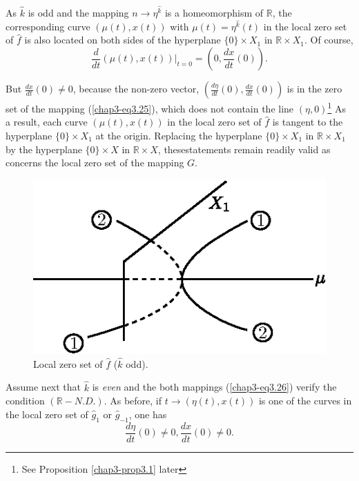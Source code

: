 As $\hat{k}$ is odd and the mapping $n \to \eta^{\hat{k}}$ is a
homeomorphism of $\mathbb{R}$, the corresponding curve $(\mu(t),
x(t))$ with $\mu(t) = \eta^{\hat{k}}(t)$ in the local zero set of
$\hat{f}$ is also located on both sides of the hyperplane $\{0\}
\times X_{1}$ in $\mathbb{R} \times X_{1}$. Of course,
$$
\frac{d}{dt} (\mu(t), x(t)) |_{t=0} = (0, \frac{dx}{dt} (0)).
$$

But $\frac{dx}{dt}(0) \neq 0$, because the non-zero vector,
$\left(\frac{d\eta}{dt}(0), \frac{dx}{dt} (0)\right)$ is in the zero
set of the mapping (\ref{chap3-eq3.25}), which does not contain the
line $(\eta, 0)$\footnote{See Proposition \ref{chap3-prop3.1} later}
As a result, each curve $(\mu(t), x(t))$ in the local zero set of
$\hat{f}$ is tangent to the hyperplane $\{0\} \times X_{1}$ at the
origin. Replacing the hyperplane $\{0\} \times X_{1}$ in $\mathbb{R}
\times X_{1}$ by the hyperplane $\{0\} \times X$ in $\mathbb{R} \times
X$, these\pageoriginale statements remain readily valid as concerns
the local zero set of the mapping $G$.
\begin{figure}[H]
\centering
\includegraphics{figure/fig76-3.2_1.eps}
\caption{Local zero set of $\hat{f}$ ($\hat{k}$ odd).}
\end{figure}


Assume next that $\hat{k}$ is {\em even} and the both mappings
(\ref{chap3-eq3.26}) verify the condition $(\mathbb{R}-N.D.)$. As
before, if $t \to (\eta(t), x(t))$ is one of the curves in the local
zero set of $\hat{g}_{1}$ or $\hat{g}_{-1}$, one has 
$$
\frac{d\eta}{dt}(0) \neq 0, \frac{dx}{dt} (0) \neq 0.
$$

